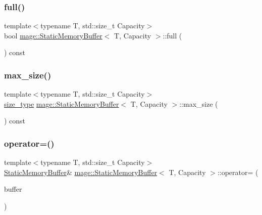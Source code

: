\subsubsection{\texorpdfstring{full()}{full()}}
{\footnotesize\ttfamily template$<$typename T, std\+::size\+\_\+t Capacity$>$ \\
bool \mbox{\hyperlink{classmage_1_1_static_memory_buffer}{mage\+::\+Static\+Memory\+Buffer}}$<$ T, Capacity $>$\+::full (\begin{DoxyParamCaption}{ }\end{DoxyParamCaption}) const\hspace{0.3cm}{\ttfamily [noexcept]}}

\mbox{\label{classmage_1_1_static_memory_buffer_a6f914dbb9951aa79543dbc9959e863d0}} 
\subsubsection{\texorpdfstring{max\+\_\+size()}{max\_size()}}
{\footnotesize\ttfamily template$<$typename T, std\+::size\+\_\+t Capacity$>$ \\
\mbox{\hyperlink{classmage_1_1_static_memory_buffer_a13e19b7af61a49400c5be360f09aadc8}{size\+\_\+type}} \mbox{\hyperlink{classmage_1_1_static_memory_buffer}{mage\+::\+Static\+Memory\+Buffer}}$<$ T, Capacity $>$\+::max\+\_\+size (\begin{DoxyParamCaption}{ }\end{DoxyParamCaption}) const\hspace{0.3cm}{\ttfamily [noexcept]}}

\mbox{\label{classmage_1_1_static_memory_buffer_a3befe8a825c142f72ee79759da900902}} 
\subsubsection{\texorpdfstring{operator=()}{operator=()}\hspace{0.1cm}{\footnotesize\ttfamily [1/2]}}
{\footnotesize\ttfamily template$<$typename T, std\+::size\+\_\+t Capacity$>$ \\
\mbox{\hyperlink{classmage_1_1_static_memory_buffer}{Static\+Memory\+Buffer}}\& \mbox{\hyperlink{classmage_1_1_static_memory_buffer}{mage\+::\+Static\+Memory\+Buffer}}$<$ T, Capacity $>$\+::operator= (\begin{DoxyParamCaption}\item[{const \mbox{\hyperlink{classmage_1_1_static_memory_buffer}{Static\+Memory\+Buffer}}$<$ T, Capacity $>$ \&}]{buffer }\end{DoxyParamCaption})\hspace{0.3cm}{\ttfamily [default]}}

